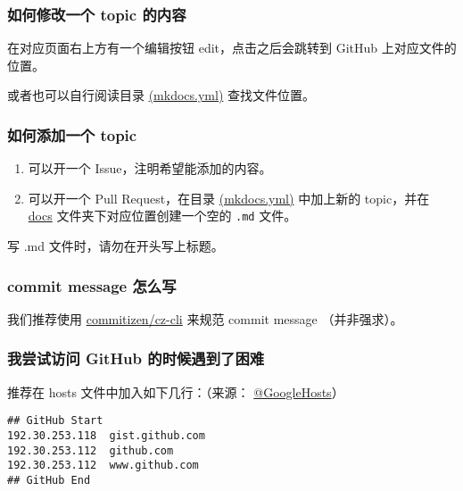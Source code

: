 \subsubsection{如何修改一个 topic 的内容}

在对应页面右上方有一个编辑按钮 edit，点击之后会跳转到 GitHub 上对应文件的位置。

或者也可以自行阅读目录 \href{https://github.com/24OI/OI-wiki/blob/master/mkdocs.yml#L17}{(mkdocs.yml)} 查找文件位置。

\subsubsection{如何添加一个 topic}

\begin{enumerate}
\item 可以开一个 Issue，注明希望能添加的内容。
\item 可以开一个 Pull Request，在目录 \href{https://github.com/24OI/OI-wiki/blob/master/mkdocs.yml#L17}{(mkdocs.yml)} 中加上新的 topic，并在 \href{https://github.com/24OI/OI-wiki/tree/master/docs}{docs} 文件夹下对应位置创建一个空的 \texttt{.md} 文件。
\end{enumerate}

\begin{NOTE}{}{}
写 .md 文件时，请勿在开头写上标题。

\end{NOTE}


\subsubsection{commit message 怎么写}

我们推荐使用 \href{https://github.com/commitizen/cz-cli}{commitizen/cz-cli} 来规范 commit message （并非强求）。

\subsubsection{我尝试访问 GitHub 的时候遇到了困难}

推荐在 hosts 文件中加入如下几行：（来源： \href{https://github.com/googlehosts/hosts/blob/master/hosts-files/hosts#L481-L485}{@GoogleHosts}）

\begin{verbatim}
## GitHub Start
192.30.253.118  gist.github.com
192.30.253.112  github.com
192.30.253.112  www.github.com
## GitHub End
\end{verbatim}

